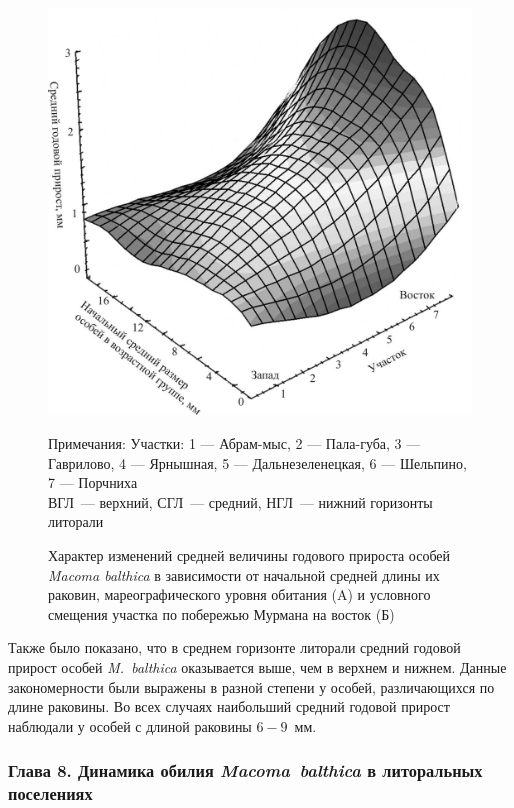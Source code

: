 {\begin{figure}[]
\begin{minipage}[b]{.5\linewidth}
\begin{center}
				\includegraphics[width=\textwidth]{../Barenc_Sea/growth_from_MSc/prirost_otklik_geography.jpg}
			\end{center}
		\end{minipage}
	\caption{Характер изменений средней величины годового прироста особей {\it Macoma balthica} в зависимости от начальной средней длины их раковин, мареографического уровня обитания (A) и условного смещения участка по побережью Мурмана на восток (Б)}
\footnotesize{Примечания: Участки: 1 --- Абрам-мыс, 2 --- Пала-губа, 3 --- Гаврилово, 4 --- Ярнышная, 5 --- Дальнезеленецкая, 6 --- Шельпино, 7 --- Порчниха\\
ВГЛ~--- верхний, СГЛ~--- средний, НГЛ~--- нижний горизонты литорали}
	\label{ris:prirost_otklik}
	\end{figure}
Также было показано, что в среднем горизонте литорали средний годовой прирост особей \textit{M.~balthica} оказывается выше, чем в верхнем и нижнем.
Данные закономерности были выражены в разной степени у особей, различающихся по длине раковины.
Во всех случаях наибольший средний годовой прирост наблюдали у особей с длиной раковины $6 - 9$~мм.



\subsubsection*{Глава 8. Динамика обилия \textit{Macoma~balthica} в литоральных поселениях}

}
